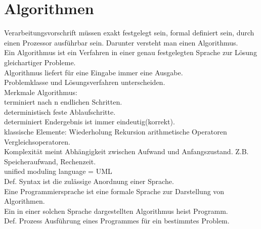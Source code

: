 \documentclass{article}
\begin{document}
	\section*{Algorithmen}
	Verarbeitungsvorschrift müssen exakt festgelegt sein, formal definiert sein, durch einen Prozessor ausführbar sein. Darunter versteht man einen Algorithmus. \\
	Ein Algorithmus ist ein Verfahren in einer genau festgelegten Sprache zur Lösung gleichartiger Probleme. \\
	Algorithmus liefert für eine Eingabe immer eine Ausgabe. \\
	Problemklasse und Lösungsverfahren unterscheiden. \\
	Merkmale Algorithmus: \\
	terminiert nach n endlichen Schritten. \\
	deterministisch feste Ablaufschritte. \\
	determiniert Endergebnis ist immer eindeutig(korrekt). \\
	klassische Elemente: Wiederholung Rekursion arithmetische Operatoren Vergleichsoperatoren. \\
	Komplexität meint Abhängigkeit zwischen Aufwand und Anfangszustand. Z.B. Speicheraufwand, Rechenzeit. \\
	unified moduling language = UML \\
	Def. Syntax ist die zulässige Anordnung einer Sprache. \\
	Eine Programmiersprache ist eine formale Sprache zur Darstellung von Algorithmen. \\
	Ein in einer solchen Sprache dargestellten Algorithmus heist Programm. \\
	Def. Prozess Ausführung eines Programmes für ein bestimmtes Problem. \\
\end{document}

